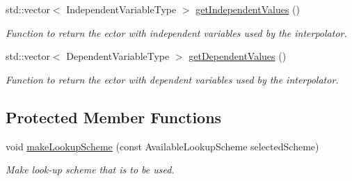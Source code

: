 \begin{DoxyCompactItemize}
std\+::vector$<$ Independent\+Variable\+Type $>$ \hyperlink{classtudat_1_1interpolators_1_1OneDimensionalInterpolator_ab6b15e16220ddf2f5896c37afb1d1e05}{get\+Independent\+Values} ()
\begin{DoxyCompactList}\small\item\em Function to return the ector with independent variables used by the interpolator. \end{DoxyCompactList}\item 
std\+::vector$<$ Dependent\+Variable\+Type $>$ \hyperlink{classtudat_1_1interpolators_1_1OneDimensionalInterpolator_ad0b73292c984422f5dd2164d3dbda3ff}{get\+Dependent\+Values} ()
\begin{DoxyCompactList}\small\item\em Function to return the ector with dependent variables used by the interpolator. \end{DoxyCompactList}\end{DoxyCompactItemize}
\subsection*{Protected Member Functions}
\begin{DoxyCompactItemize}
\item 
void \hyperlink{classtudat_1_1interpolators_1_1OneDimensionalInterpolator_abc218f1803c7f54fad3e0e71d625c764}{make\+Lookup\+Scheme} (const Available\+Lookup\+Scheme selected\+Scheme)
\begin{DoxyCompactList}\small\item\em Make look-\/up scheme that is to be used. \end{DoxyCompactList}\end{DoxyCompactItemize}
